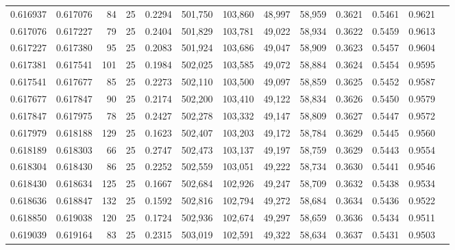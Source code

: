 \begin{tabular}{rrrrrrrrrrrrr}
0.616937 & 0.617076 &    84 &  25 &                                     0.2294 & 501,750 & 103,860 &  48,997 &  58,959 & 0.3621 & 0.5461 & 0.9621 \\
0.617076 & 0.617227 &    79 &  25 &                                     0.2404 & 501,829 & 103,781 &  49,022 &  58,934 & 0.3622 & 0.5459 & 0.9613 \\
0.617227 & 0.617380 &    95 &  25 &                                     0.2083 & 501,924 & 103,686 &  49,047 &  58,909 & 0.3623 & 0.5457 & 0.9604 \\
0.617381 & 0.617541 &   101 &  25 &                                     0.1984 & 502,025 & 103,585 &  49,072 &  58,884 & 0.3624 & 0.5454 & 0.9595 \\
0.617541 & 0.617677 &    85 &  25 &                                     0.2273 & 502,110 & 103,500 &  49,097 &  58,859 & 0.3625 & 0.5452 & 0.9587 \\
0.617677 & 0.617847 &    90 &  25 &                                     0.2174 & 502,200 & 103,410 &  49,122 &  58,834 & 0.3626 & 0.5450 & 0.9579 \\
0.617847 & 0.617975 &    78 &  25 &                                     0.2427 & 502,278 & 103,332 &  49,147 &  58,809 & 0.3627 & 0.5447 & 0.9572 \\
0.617979 & 0.618188 &   129 &  25 &                                     0.1623 & 502,407 & 103,203 &  49,172 &  58,784 & 0.3629 & 0.5445 & 0.9560 \\
0.618189 & 0.618303 &    66 &  25 &                                     0.2747 & 502,473 & 103,137 &  49,197 &  58,759 & 0.3629 & 0.5443 & 0.9554 \\
0.618304 & 0.618430 &    86 &  25 &                                     0.2252 & 502,559 & 103,051 &  49,222 &  58,734 & 0.3630 & 0.5441 & 0.9546 \\
0.618430 & 0.618634 &   125 &  25 &                                     0.1667 & 502,684 & 102,926 &  49,247 &  58,709 & 0.3632 & 0.5438 & 0.9534 \\
0.618636 & 0.618847 &   132 &  25 &                                     0.1592 & 502,816 & 102,794 &  49,272 &  58,684 & 0.3634 & 0.5436 & 0.9522 \\
0.618850 & 0.619038 &   120 &  25 &                                     0.1724 & 502,936 & 102,674 &  49,297 &  58,659 & 0.3636 & 0.5434 & 0.9511 \\
0.619039 & 0.619164 &    83 &  25 &                                     0.2315 & 503,019 & 102,591 &  49,322 &  58,634 & 0.3637 & 0.5431 & 0.9503 \\

\end{tabular}
